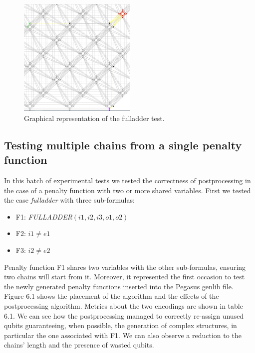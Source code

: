 \begin{figure}[]
    \centering
    \includegraphics[width=0.5\textwidth]{images/fulladder.PNG}
    \caption{Graphical representation of the fulladder test.}
    \label{fig:my_label}
\end{figure}

\subsection{Testing multiple chains from a single penalty function}

In this batch of experimental tests we tested the correctness of postprocessing in the case of a penalty function with two or more shared variables. First we tested the case \textit{fulladder} with three sub-formulas:

\begin{itemize}
    \item F1: \textit{FULLADDER}$(i1,i2,i3,o1,o2)$
    \item F2: $i1 \neq e1$
    \item F3: $i2 \neq e2$
\end{itemize}

Penalty function F1 shares two variables with the other sub-formulas, ensuring two chains will start from it. Moreover, it represented the first occasion to test the newly generated penalty functions inserted into the Pegasus genlib file.
Figure 6.1 shows the placement of the algorithm and the effects of the postprocessing algorithm. Metrics about the two encodings are shown in table 6.1. We can see how the postprocessing managed to correctly re-assign unused qubits guaranteeing, when possible, the generation of complex structures, in particular the one associated with F1. We can also observe a reduction to the chains' length and the presence of wasted qubits. 

